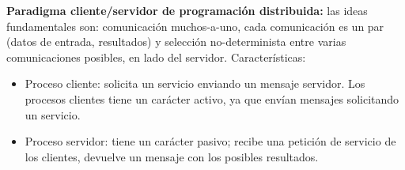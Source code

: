 \documentclass[a4paper,11pt]{article}
\begin{document}
\textbf{Paradigma cliente/servidor de programación distribuida:} las ideas fundamentales son: comunicación muchos-a-uno, cada comunicación es un par (datos de entrada, resultados) y selección no-determinista entre varias comunicaciones posibles, en lado del servidor. Características:

\begin{itemize}
\item Proceso cliente: solicita un servicio enviando un mensaje servidor. Los procesos clientes tiene un carácter activo, ya que envían mensajes solicitando un servicio.

\item Proceso servidor: tiene un carácter pasivo; recibe una petición de servicio de los clientes, devuelve un mensaje con los posibles resultados.
\end{itemize}
\end{document}
